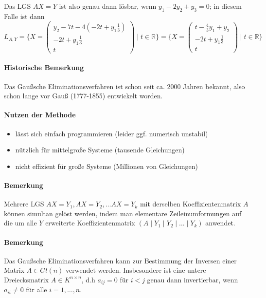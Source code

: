 	 Das LGS $ AX=Y $ ist also genau dann lösbar, wenn $ y_1-2y_2+y_3 = 0 $; in diesem Falle ist dann
	 	\[ L_{A,Y} = \{X =
	 		\begin{pmatrix} y_2-7t-4(-2t+y_1\frac{1}{3})\\-2t+y_1\frac{1}{3}\\t\end{pmatrix}
	 	\mid t\in \mathbb{R}\}
	 	= \{X =
	 		\begin{pmatrix} t-\frac{4}{3}y_1+y_2\\-2t+y_1\frac{1}{3}\\t\end{pmatrix}
	 	\mid t\in \mathbb{R}\} \]
\paragraph{Historische Bemerkung}
	Das Gaußsche Eliminationsverfahren ist schon seit ca. 2000 Jahren bekannt, also schon lange vor Gauß (1777-1855) entwickelt worden.
	
\paragraph{Nutzen der Methode}
	\begin{itemize}
		\item lässt sich einfach programmieren (leider ggf. numerisch unstabil)
		\item nützlich für mittelgroße Systeme (tausende Gleichungen)
		\item nicht effizient für große Systeme (Millionen von Gleichungen)
	\end{itemize}
\paragraph{Bemerkung}
	Mehrere LGS $ AX = Y_1, AX = Y_2, \dots AX = Y_k $ mit derselben Koeffizientenmatrix $ A $ können simultan gelöst werden, indem man elementare Zeileinumformungen auf die um alle $ Y $ erweiterte Koeffizientenmatrix $ (A\mid Y_1\mid Y_2\mid \dots \mid Y_k) $ anwendet.
\paragraph{Bemerkung}
	Das Gaußsche Eliminationsverfahren kann zur Bestimmung der Inversen einer Matrix $ A\in Gl(n) $ verwendet werden. Insbesondere ist eine untere Dreiecksmatrix $ A\in K^{n\times n} $, d.h $ a_{ij} = 0 $ für $ i<j $ genau dann invertierbar, wenn $ a_{ii}\neq 0 $ für alle $ i=1,\dots,n $.